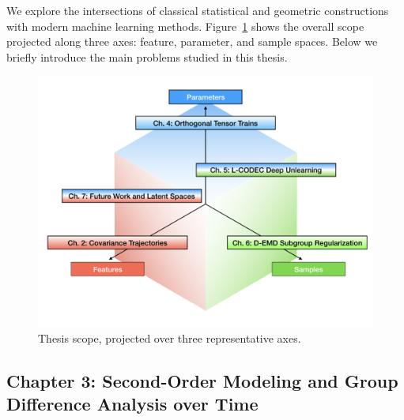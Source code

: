 We explore the intersections of classical statistical and geometric constructions with modern machine learning methods. 
Figure~\ref{fig:scope} shows the overall scope projected along three axes: feature, parameter, and sample spaces.
Below we briefly introduce the main problems studied in this thesis.
\begin{figure}[!ht]
    \centering
    \includegraphics[width=0.95\linewidth]{1_intro/thesis_scope_diss/thesis_scope_diss.png}
    \vspace{-10pt}
    \caption[Thesis Scope]{Thesis scope, projected over three representative axes.}
    \label{fig:scope}
\end{figure}

\subsection{Chapter 3: Second-Order Modeling and Group Difference Analysis over Time}

